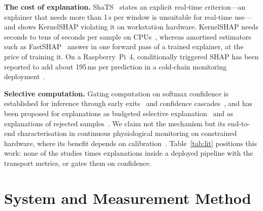 \documentclass[conference]{IEEEtran}
\newcommand{\ms}{\,ms\xspace}
\begin{document}
\textbf{The cost of explanation.} ShaTS~\cite{shats2025} states an explicit
real-time criterion---an explainer that needs more than 1\,s per window is
unsuitable for real-time use---and shows KernelSHAP violating it on
workstation hardware. KernelSHAP needs seconds to tens of seconds per
sample on CPUs~\cite{warnecke2020,jethani2022}, whereas amortised
estimators such as FastSHAP~\cite{jethani2022} answer in one forward pass
of a trained explainer, at the price of training it. On a Raspberry~Pi~4,
conditionally triggered SHAP has been reported to add about 195\ms per
prediction in a cold-chain monitoring deployment~\cite{taguta2026}.

\textbf{Selective computation.} Gating computation on softmax confidence is
established for inference through early exits~\cite{teerapittayanon2017}
and confidence cascades~\cite{berestizshevsky2018}, and has been proposed
for explanations as budgeted selective explanation~\cite{paes2024} and as
explanations of rejected samples~\cite{artelt2023}. We claim not the
mechanism but its end-to-end characterisation in continuous physiological
monitoring on constrained hardware, where its benefit depends on
calibration~\cite{guo2017}. Table~\ref{tab:lit} positions this work: none
of the studies times explanations inside a deployed pipeline with the
transport metrics, or gates them on confidence.

\section{System and Measurement Method}
\label{sec:system}
\end{document}
